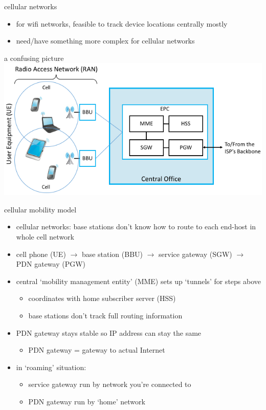 \begin{frame}{cellular networks}
    \begin{itemize}
    \item for wifi networks, feasible to track device locations centrally mostly
    \vspace{.5cm}
    \item need/have something more complex for cellular networks
    \end{itemize}
\end{frame}

\begin{frame}{a confusing picture}
\includegraphics[width=\textwidth]{../multiaccess/sysapp-fig53}
\end{frame}

\begin{frame}{cellular mobility model}
    \begin{itemize}
    \item cellular networks: base stations don't know how to route to each end-host in whole cell network
    \vspace{.5cm}
    \item cell phone (UE) $\rightarrow$ base station (BBU) $\rightarrow$ service gateway (SGW) $\rightarrow$ PDN gateway (PGW)
    \vspace{.5cm}
    \item central `mobility management entity' (MME) sets up `tunnels' for steps above
        \begin{itemize}
        \item coordinates with home subscriber server (HSS)
        \item base stations don't track full routing information
        \end{itemize}
    \item PDN gateway stays stable so IP address can stay the same
        \begin{itemize}
        \item PDN gateway = gateway to actual Internet
        \end{itemize}
    \item in `roaming' situation:
        \begin{itemize}
        \item service gateway run by network you're connected to
        \item PDN gateway run by `home' network
        \end{itemize}
    \end{itemize}
\end{frame}

